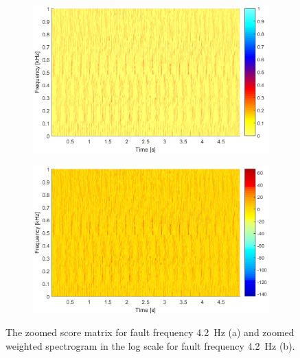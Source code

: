\begin{figure}[!ht]
\begin{subfigure}[b]{0.49\textwidth}
        \caption{}
        \includegraphics[width=\textwidth]{wykresy/chapter_application/semi_blind/wagiL212_4_zoom.png}
    \end{subfigure}
    \begin{subfigure}[b]{0.49\textwidth}
        \centering
        \captionsetup{skip=0.01pt}
        \caption{}
        \includegraphics[width=\textwidth]{wykresy/chapter_application/semi_blind/mapkaL212_log_4_zoom.png}
    \end{subfigure}    
    \caption{The zoomed score matrix for fault frequency 4.2~Hz (a) and zoomed weighted spectrogram in the log scale for fault frequency 4.2~Hz (b).}\label{fig:chapter7/semi_blind/score_zoom}
\end{figure}
%
